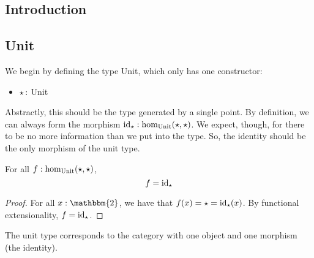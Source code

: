 \documentclass[main.tex]{subfiles}
\begin{document}
\subsection{Introduction}

\subsection{Unit}
We begin by defining the type Unit, which only has one constructor:
\begin{itemize}
    \item $\star\,: \ $Unit
\end{itemize}
Abstractly, this should be the type generated by a single point. By definition, we can always form the morphism $\id{\star} : \ho[\text{Unit}]{\star}{\star}$. We expect, though, for there to be no more information than we put into the type. So, the identity should be the only morphism of the unit type.
\begin{lemma} For all $ \normalfont f : \ho[\text{Unit}]{\star}{\star}$,
\[ f = \id{\star}\]
\end{lemma}
\begin{proof}
For all $x : \mathbbm{2}$, we have that $f(x) = \star = \id{\star}(x)$. By functional extensionality, $f = \id{\star}$.
\end{proof}
The unit type corresponds to the category with one object and one morphism (the identity).
\end{document}
